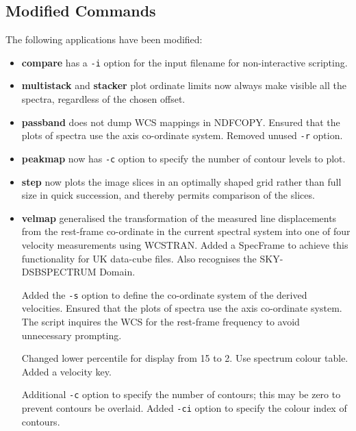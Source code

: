 \documentclass[twoside,11pt]{article}
\newcommand{\htmlref}[2]{#1}
\newcommand{\xref}[3]{#1}
\renewcommand{\_}{\texttt{\symbol{95}}}
\begin{document}
\subsection{Modified Commands}
The following applications have been modified:

\begin{itemize}

\item \htmlref{{\bf compare}}{compare} has a {\tt -i} option for the
input filename for non-interactive scripting.

\item \htmlref{{\bf multistack}}{multistack} and
\htmlref{{\bf stacker}}{stacker} plot ordinate limits now always
make visible all the spectra, regardless of the chosen offset.

\item \htmlref{{\bf passband}}{passband} does not dump WCS mappings
in \xref{NDFCOPY}{sun95}{NDFCOPY}.  Ensured that the plots of spectra
use the axis co-ordinate system.  Removed unused {\tt -r} option.

\item \htmlref{{\bf peakmap}}{peakmap} now has {\tt -c} option to
specify the number of contour levels to plot.

\item \htmlref{{\bf step}}{step} now plots the image slices in an
optimally shaped grid rather than full size in quick succession, and
thereby permits comparison of the slices.

\item \htmlref{{\bf velmap}}{velmap} generalised the transformation of the
measured line displacements from the rest-frame co-ordinate in the
current spectral system into one of four velocity measurements using
WCSTRAN.  Added a SpecFrame to achieve this functionality for
UK data-cube files.  Also recognises the
\xref{SKY-DSBSPECTRUM Domain}{sun95}{se_domains}.

Added the {\tt -s} option to define the co-ordinate system of the
derived velocities.  Ensured that the plots of spectra use the axis
co-ordinate system.  The script inquires the WCS for the rest-frame
frequency to avoid unnecessary prompting.

Changed lower percentile for display from 15 to 2.  Use spectrum
colour table.  Added a velocity key.

Additional {\tt -c} option to specify the number of contours; this may
be zero to prevent contours be overlaid.  Added {\tt -ci} option to
specify the colour index of contours.

\end{itemize}
\end{document}
